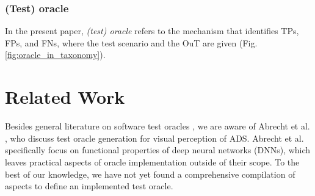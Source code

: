 \documentclass[conference]{IEEEtran}
\begin{document}







\subsubsection{(Test) oracle} \label{def:oracle} 
In the present paper, \textit{(test) oracle} refers to the mechanism that identifies TPs, FPs, and FNs, where the test scenario and the OuT are given (Fig. \ref{fig:oracle_in_taxonomy}).




\section{Related Work}
\label{sec:related_work}

Besides general literature on software test oracles \cite{Barr2015oracle}, we are aware of Abrecht et al. \cite{Abrecht2021testing}, who discuss test oracle generation for visual perception of ADS.
Abrecht et al. specifically focus on functional properties of deep neural networks (DNNs), which leaves practical aspects of oracle implementation outside of their scope.
To the best of our knowledge, we have not yet found a comprehensive compilation of aspects to define an implemented test oracle.
\end{document}
